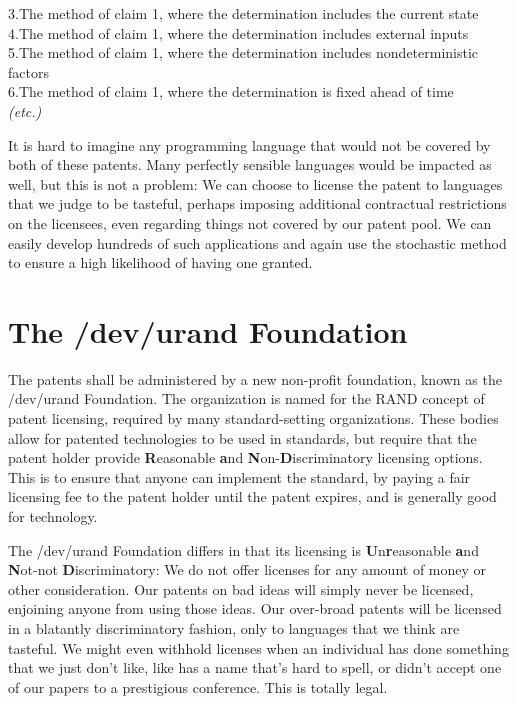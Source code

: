 \documentclass[acmtocl]%
{boviktrans}
\begin{document}
3.\quad The method of claim 1, where the determination includes the current state \\

4.\quad The method of claim 1, where the determination includes external inputs \\

5.\quad The method of claim 1, where the determination includes nondeterministic factors \\

6.\quad The method of claim 1, where the determination is fixed ahead of time \\

{\it (etc.)}

It is hard to imagine any programming language that would not be
covered by both of these patents. Many perfectly sensible languages
would be impacted as well, but this is not a problem: We can choose to
license the patent to languages that we judge to be tasteful, perhaps
imposing additional contractual restrictions on the licensees, even
regarding things not covered by our patent pool. We can easily
develop hundreds of such applications and again use the stochastic
method to ensure a high likelihood of having one granted.

\section{The /dev/urand Foundation}

The patents shall be administered by a new non-profit foundation,
known as the /dev/urand Foundation. The organization is named for the
RAND concept of patent licensing, required by many standard-setting
organizations. These bodies allow for patented technologies to be used
in standards, but require that the patent holder provide {\bf
  R}easonable {\bf a}nd {\bf N}on-{\bf D}iscriminatory licensing
options. This is to ensure that anyone can implement the standard, by
paying a fair licensing fee to the patent holder until the patent
expires, and is generally good for technology.

The /dev/urand Foundation differs in that its licensing is {\bf
  U}n{\bf r}easonable {\bf a}nd {\bf N}ot-not {\bf D}iscriminatory: We
do not offer licenses for any amount of money or other consideration.
Our patents on bad ideas will simply never be licensed, enjoining
anyone from using those ideas. Our over-broad patents will be licensed
in a blatantly discriminatory fashion, only to languages that we think
are tasteful. We might even withhold licenses when an individual has
done something that we just don't like, like has a name that's hard to
spell, or didn't accept one of our papers to a prestigious
conference. This is totally legal.
\end{document}
